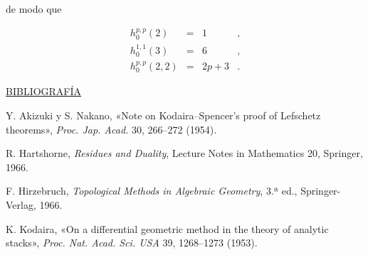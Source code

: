 de modo que

\begin{equation*}
\begin{array}{rcll}
h_0^{p,p}(2)&=&1&,\\[2ex]
h_0^{1,1}(3)&=&6&,\\[2ex]
h_0^{p,p}(2,2)&=&2p+3&.
\end{array}
\end{equation*}

\pageoriginale

\bigskip
\begin{center}
\underline{BIBLIOGRAFÍA}
\end{center}

\begin{enumerate}[label={[\arabic*]},leftmargin=3em]
\item Y. Akizuki y S. Nakano, «Note on Kodaira--Spencer's proof of
Lefschetz theorems», \emph{Proc. Jap. Acad.} 30, 266--272 (1954).

\item R. Hartshorne, \emph{Residues and Duality}, Lecture Notes in
Mathematics 20, Springer, 1966.

\item F. Hirzebruch, \emph{Topological Methods in Algebraic Geometry},
3.ª ed., Springer-Verlag, 1966.

\item K. Kodaira, «On a differential geometric method in the theory of
analytic stacks», \emph{Proc. Nat. Acad. Sci. USA} 39, 1268--1273
(1953).
\end{enumerate}

